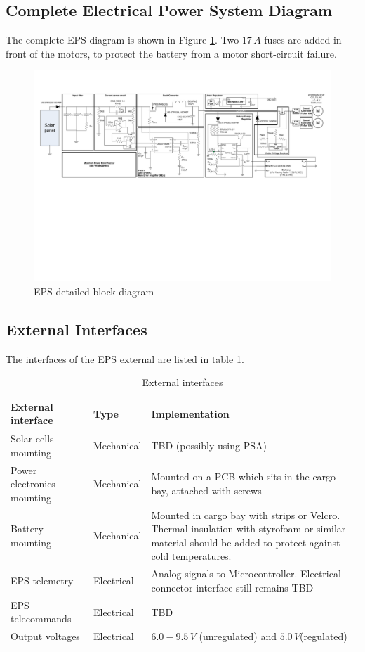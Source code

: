 \subsection{Complete Electrical Power System Diagram}
%
The complete \ac{EPS} diagram is shown in Figure \ref{fig:EPS_diagram_detailed}. Two $17\,A$ fuses are added in front of the motors, to protect the battery from a motor short-circuit failure.
%
\begin{figure}
\centering
\includegraphics[scale=0.8]{figures/fig_CDR_EPSdiagram_detailed}
\caption{\ac{EPS} detailed block diagram}
\label{fig:EPS_diagram_detailed}
\end{figure}

%
\subsection{External Interfaces}
%
The interfaces of the \ac{EPS} external are listed in table \ref{tab:external_interfaces}.
%
\begin{table}[H]
\centering
\caption{External interfaces}
\label{tab:external_interfaces}
\begin{tabular}{m{}m{}m{}}
\hline
\textbf{External interface} & \textbf{Type} & \textbf{Implementation}\\
\hline
Solar cells mounting & Mechanical & \ac{TBD} (possibly using \ac{PSA})\\[2mm]
Power electronics mounting & Mechanical & Mounted on a \ac{PCB} which sits in the cargo bay, attached with screws\\[2mm]
Battery mounting & Mechanical & Mounted in cargo bay with strips or Velcro. Thermal insulation with styrofoam or similar material should be added to protect against cold temperatures.\\[2mm]
\ac{EPS} telemetry & Electrical & Analog signals to Microcontroller. Electrical connector interface still remains \ac{TBD}\\[2mm]
\ac{EPS} telecommands & Electrical & \ac{TBD}\\[2mm]
Output voltages & Electrical & $6.0-9.5\,V$ (unregulated) and $5.0\,V$(regulated)\\[2mm]
\hline
\end{tabular}
\end{table}
%
%
